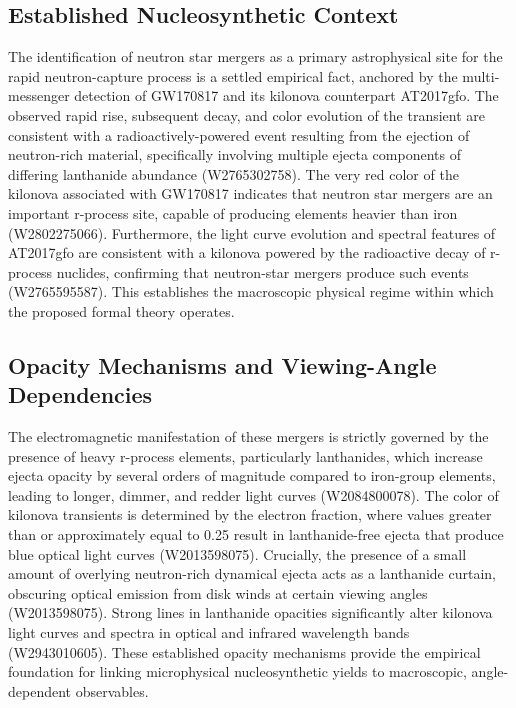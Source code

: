 \documentclass[conference]{IEEEtran}
\begin{document}
\subsection{Established Nucleosynthetic Context}
The identification of neutron star mergers as a primary astrophysical site for the rapid neutron-capture process is a settled empirical fact, anchored by the multi-messenger detection of GW170817 and its kilonova counterpart AT2017gfo. The observed rapid rise, subsequent decay, and color evolution of the transient are consistent with a radioactively-powered event resulting from the ejection of neutron-rich material, specifically involving multiple ejecta components of differing lanthanide abundance (W2765302758). The very red color of the kilonova associated with GW170817 indicates that neutron star mergers are an important r-process site, capable of producing elements heavier than iron (W2802275066). Furthermore, the light curve evolution and spectral features of AT2017gfo are consistent with a kilonova powered by the radioactive decay of r-process nuclides, confirming that neutron-star mergers produce such events (W2765595587). This establishes the macroscopic physical regime within which the proposed formal theory operates.~\cite{cite_30c88fe46f23448d,cite_492ec5910d5efd57,cite_612290131318c0d4}

\subsection{Opacity Mechanisms and Viewing-Angle Dependencies}
The electromagnetic manifestation of these mergers is strictly governed by the presence of heavy r-process elements, particularly lanthanides, which increase ejecta opacity by several orders of magnitude compared to iron-group elements, leading to longer, dimmer, and redder light curves (W2084800078). The color of kilonova transients is determined by the electron fraction, where values greater than or approximately equal to 0.25 result in lanthanide-free ejecta that produce blue optical light curves (W2013598075). Crucially, the presence of a small amount of overlying neutron-rich dynamical ejecta acts as a lanthanide curtain, obscuring optical emission from disk winds at certain viewing angles (W2013598075). Strong lines in lanthanide opacities significantly alter kilonova light curves and spectra in optical and infrared wavelength bands (W2943010605). These established opacity mechanisms provide the empirical foundation for linking microphysical nucleosynthetic yields to macroscopic, angle-dependent observables.~\cite{cite_2bf3a687e25803e4,cite_2e146bff5b4a005e,cite_bbb76a303fab42b5}
\end{document}
